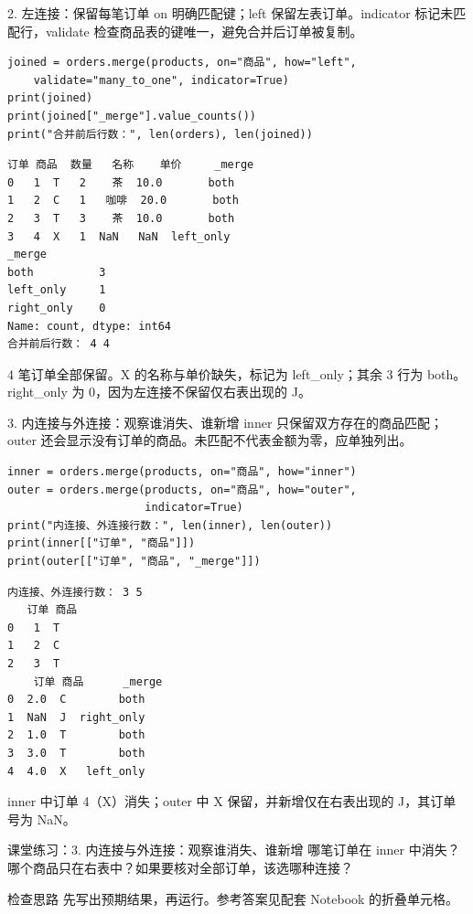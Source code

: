 \documentclass[9pt]{ctexbeamer}
\begin{document}
\begin{frame}[fragile]{2. 左连接：保留每笔订单}
\small on 明确匹配键；left 保留左表订单。indicator 标记未匹配行，validate 检查商品表的键唯一，避免合并后订单被复制。
\medskip
\begin{lstlisting}[basicstyle=\ttfamily\scriptsize]
joined = orders.merge(products, on="商品", how="left",
    validate="many_to_one", indicator=True)
print(joined)
print(joined["_merge"].value_counts())
print("合并前后行数：", len(orders), len(joined))
\end{lstlisting}
\begin{lstlisting}[language={},numbers=none,basicstyle=\ttfamily\scriptsize]
   订单 商品  数量   名称    单价     _merge
0   1  T   2    茶  10.0       both
1   2  C   1   咖啡  20.0       both
2   3  T   3    茶  10.0       both
3   4  X   1  NaN   NaN  left_only
_merge
both          3
left_only     1
right_only    0
Name: count, dtype: int64
合并前后行数： 4 4
\end{lstlisting}
\small 4 笔订单全部保留。X 的名称与单价缺失，标记为 left\_only；其余 3 行为 both。right\_only 为 0，因为左连接不保留仅右表出现的 J。
\end{frame}

\begin{frame}[fragile]{3. 内连接与外连接：观察谁消失、谁新增}
\small inner 只保留双方存在的商品匹配；outer 还会显示没有订单的商品。未匹配不代表金额为零，应单独列出。
\medskip
\begin{lstlisting}[basicstyle=\ttfamily\scriptsize]
inner = orders.merge(products, on="商品", how="inner")
outer = orders.merge(products, on="商品", how="outer",
                     indicator=True)
print("内连接、外连接行数：", len(inner), len(outer))
print(inner[["订单", "商品"]])
print(outer[["订单", "商品", "_merge"]])
\end{lstlisting}
\begin{lstlisting}[language={},numbers=none,basicstyle=\ttfamily\scriptsize]
内连接、外连接行数： 3 5
   订单 商品
0   1  T
1   2  C
2   3  T
    订单 商品      _merge
0  2.0  C        both
1  NaN  J  right_only
2  1.0  T        both
3  3.0  T        both
4  4.0  X   left_only
\end{lstlisting}
\small inner 中订单 4（X）消失；outer 中 X 保留，并新增仅在右表出现的 J，其订单号为 NaN。
\end{frame}
\begin{frame}[fragile]{课堂练习：3. 内连接与外连接：观察谁消失、谁新增}
哪笔订单在 inner 中消失？哪个商品只在右表中？如果要核对全部订单，该选哪种连接？
\medskip
\begin{block}{检查思路}
先写出预期结果，再运行。参考答案见配套 Notebook 的折叠单元格。
\end{block}
\end{frame}
\end{document}
